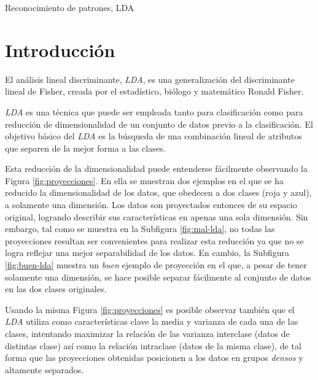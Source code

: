 \documentclass[journal]{IEEEtran}
\begin{document}
\begin{IEEEkeywords}
Reconocimiento de patrones, LDA
\end{IEEEkeywords}

\section{Introducción}
\label{sec:introduccion}
El análisis lineal discriminante, \emph{LDA}, es una generalización del discriminante lineal de Fisher, creada por el estadístico, biólogo y matemático Ronald Fisher.

\emph{LDA} es una técnica que puede ser empleada tanto para clasificación como para reducción de dimensionalidad de un conjunto de datos previo a la clasificación.
El objetivo básico del \emph{LDA} es la búsqueda de una combinación lineal de atributos que separen de la mejor forma a las clases.

Esta reducción de la dimensionalidad puede entenderse fácilmente observando la Figura \ref{fig:proyecciones}.
En ella se muestran dos ejemplos en el que se ha reducido la dimensionalidad de los datos, que obedecen a dos clases (roja y azul), a solamente una dimensión.
Los datos son proyectados entonces de su espacio original, logrando describir sus características en apenas una sola dimensión.
Sin embargo, tal como se muestra en la Subfigura \ref{fig:mal-lda}, no todas las proyecciones resultan ser convenientes para realizar esta reducción ya que no se logra reflejar una mejor separabilidad de los datos.
En cambio, la Subfigura \ref{fig:buen-lda} muestra un \emph{buen} ejemplo de proyección en el que, a pesar de tener solamente una dimensión, se hace posible separar fácilmente al conjunto de datos en las dos clases originales.
\begin{figure*} 
\centering 

	\caption{Ejemplo de proyecciones}
	\label{fig:proyecciones}
\end{figure*}


Usando la misma Figura \ref{fig:proyecciones} es posible observar también que el \emph{LDA} utiliza como características clave la media y varianza de cada una de las clases, intentando maximizar la relación de las varianza interclase (datos de distintas clase) así como la relación intraclase (datos de la misma clase), de tal forma que las proyecciones obtenidas posicionen a los datos en grupos \emph{densos} y altamente separados.
\end{document}
